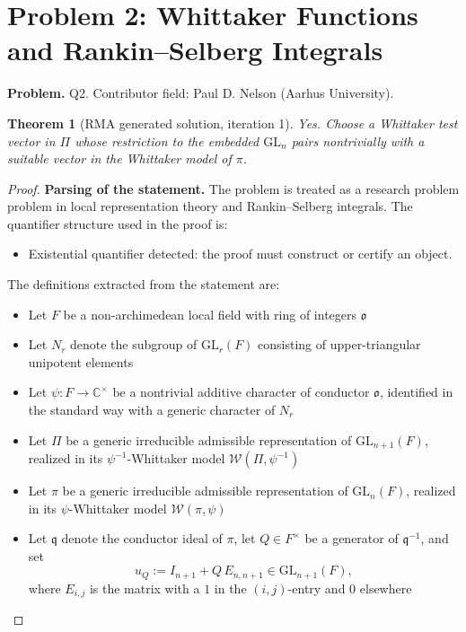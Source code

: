 \documentclass[11pt]{article}
\newtheorem{theorem}{Theorem}
\begin{document}
\section*{Problem 2: Whittaker Functions and Rankin--Selberg Integrals}

\noindent\textbf{Problem.} Q2. Contributor field: Paul D. Nelson (Aarhus University).

\begin{theorem}[RMA generated solution, iteration 1]
Yes. Choose a Whittaker test vector in \(\Pi\) whose restriction to the embedded \(\mathrm{GL}_n\) pairs nontrivially with a suitable vector in the Whittaker model of \(\pi\).
\end{theorem}

\begin{proof}
\textbf{Parsing of the statement.}
The problem is treated as a research problem problem in local representation theory and Rankin--Selberg integrals.
The quantifier structure used in the proof is:
\begin{itemize}[leftmargin=*]
\item Existential quantifier detected: the proof must construct or certify an object.
\end{itemize}
The definitions extracted from the statement are:
\begin{itemize}[leftmargin=*]
\item Let \(F\) be a non-archimedean local field with ring of integers \(\mathfrak o\)
\item Let $N_r$ denote the subgroup of $\mathrm{GL}_{r}(F)$ consisting of upper-triangular unipotent elements
\item Let \(\psi:F\to \mathbb C^\times\) be a nontrivial additive character of conductor \(\mathfrak o\), identified in the standard way with a generic character of $N_r$
\item Let \(\Pi\) be a generic irreducible admissible representation of \(\mathrm{GL}_{n + 1}(F)\), realized in its \(\psi^{-1}\)-Whittaker model \(\mathcal W(\Pi,\psi^{-1})\)
\item Let $\pi$ be a generic irreducible admissible representation of \(\mathrm{GL}_{n}(F)\), realized in its $\psi$-Whittaker model \(\mathcal W(\pi,\psi)\)
\item Let $\mathfrak{q}$ denote the conductor ideal of $\pi$, let \(Q\in F^\times\) be a generator of \(\mathfrak q^{-1}\), and set \[ u_Q := I_{n+1} + Q\,E_{n,n+1} \in \mathrm{GL}_{n + 1}(F), \] where \(E_{i, j}\) is the matrix with a \(1\) in the \((i, j)\)-entry and \(0\) elsewhere
\end{itemize}


\end{proof}
\end{document}
